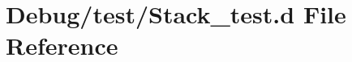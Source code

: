 \hypertarget{_stack__test_8d}{}\section{Debug/test/\+Stack\+\_\+test.d File Reference}
\label{_stack__test_8d}
